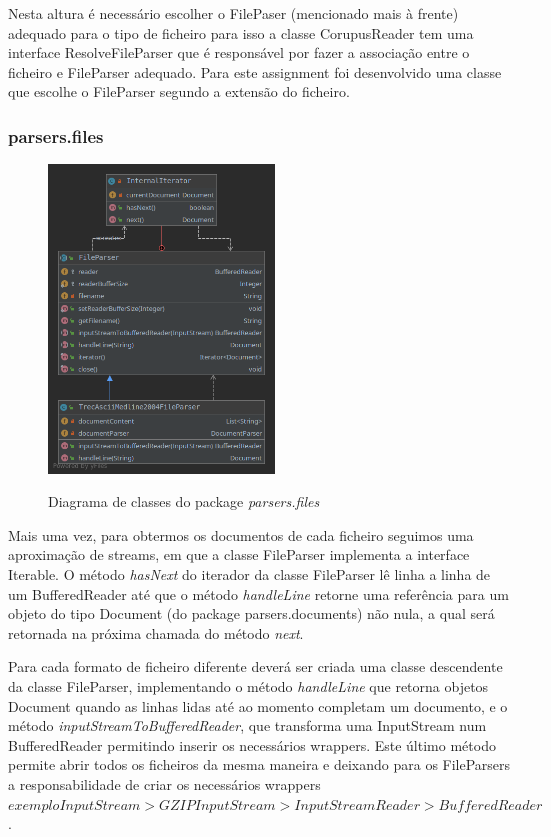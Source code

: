 \documentclass[12pt]{article}
\begin{document}
Nesta altura é necessário escolher o FilePaser (mencionado mais à frente) adequado para
o tipo de ficheiro para isso a classe CorupusReader tem uma interface ResolveFileParser
que é responsável por fazer a associação entre o ficheiro e FileParser adequado. Para este
assignment foi desenvolvido uma classe que escolhe o FileParser segundo a extensão do ficheiro.


\subsubsection{parsers.files}
\begin{figure}[h]
  \center
  \includegraphics[width=6cm]{packages_parsers_files.png}
  \label{fig:packages_parsers_files}
  \caption{Diagrama de classes do package \it parsers.files}
\end{figure}

Mais uma vez, para obtermos os documentos de cada ficheiro seguimos uma aproximação
de streams, em que a classe FileParser implementa a interface Iterable. O método
{\it hasNext} do iterador da classe FileParser lê linha a linha de um BufferedReader
até que o método {\it handleLine} retorne uma referência para um objeto do tipo Document
(do package parsers.documents) não nula, a qual será retornada na próxima chamada do
método {\it next}.

Para cada formato de ficheiro diferente deverá ser criada uma classe descendente da classe
FileParser, implementando o método {\it handleLine} que retorna objetos Document quando
as linhas lidas até ao momento completam um documento, e o método {\it inputStreamToBufferedReader},
que transforma uma InputStream num BufferedReader permitindo inserir os necessários wrappers.
Este último método permite abrir todos os ficheiros da mesma maneira e deixando para os FileParsers
a responsabilidade de criar os necessários wrappers \(exemplo InputStream >
GZIPInputStream > InputStreamReader > BufferedReader\).
\end{document}
